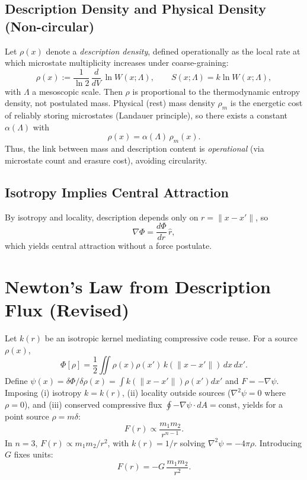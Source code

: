 \documentclass[aps,preprint,onecolumn,longbibliography,nofootinbib]{revtex4-2}
\numberwithin{equation}{section}        %
\begin{document}
\subsection{Description Density and Physical Density (Non-circular)}
Let $\rho(x)$ denote a \emph{description density}, defined operationally as the local rate at which microstate multiplicity increases under coarse-graining:
\begin{equation}
\rho(x) := \frac{1}{\ln 2}\,\frac{d}{dV}\,\ln W(x; \Lambda), \qquad S(x;\Lambda)=k\ln W(x;\Lambda), \label{eq:rhorig}
\end{equation}
with $\Lambda$ a mesoscopic scale. Then $\rho$ is proportional to the thermodynamic entropy density, not postulated mass. Physical (rest) mass density $\rho_m$ is the energetic cost of reliably storing microstates (Landauer principle), so there exists a constant $\alpha(\Lambda)$ with
\begin{equation}
\rho(x) = \alpha(\Lambda)\,\rho_m(x). \label{eq:rho}
\end{equation}
Thus, the link between mass and description content is \emph{operational} (via microstate count and erasure cost), avoiding circularity.

\subsection{Isotropy Implies Central Attraction}
By isotropy and locality, description depends only on $r=\|x-x'\|$, so
\begin{equation}
\nabla \Phi = \frac{d\Phi}{dr}\,\hat r, \label{eq:central}
\end{equation}
which yields central attraction without a force postulate.

\section{Newton's Law from Description Flux (Revised)}
Let $k(r)$ be an isotropic kernel mediating compressive code reuse. For a source $\rho(x)$,
\begin{equation}
\Phi[\rho] = \frac12\iint \rho(x)\rho(x')\,k(\|x-x'\|)\,dx\,dx'. \label{eq:pair}
\end{equation}
Define $\psi(x)=\delta\Phi/\delta\rho(x)=\int k(\|x-x'\|)\rho(x')dx'$ and $F=-\nabla\psi$. Imposing (i) isotropy $k=k(r)$, (ii) locality outside sources ($\nabla^2\psi=0$ where $\rho=0$), and (iii) conserved compressive flux $\oint -\nabla\psi\cdot dA=\text{const}$, yields for a point source $\rho=m\delta$:
\begin{equation}
F(r) \propto \frac{m_1 m_2}{r^{n-1}}. \label{eq:dimlaw}
\end{equation}
In $n=3$, $F(r)\propto m_1m_2/r^2$, with $k(r)=1/r$ solving $\nabla^2\psi=-4\pi\rho$. Introducing $G$ fixes units:
\begin{equation}
F(r) = -G\,\frac{m_1m_2}{r^2}. \label{eq:newton}
\end{equation}
\end{document}
